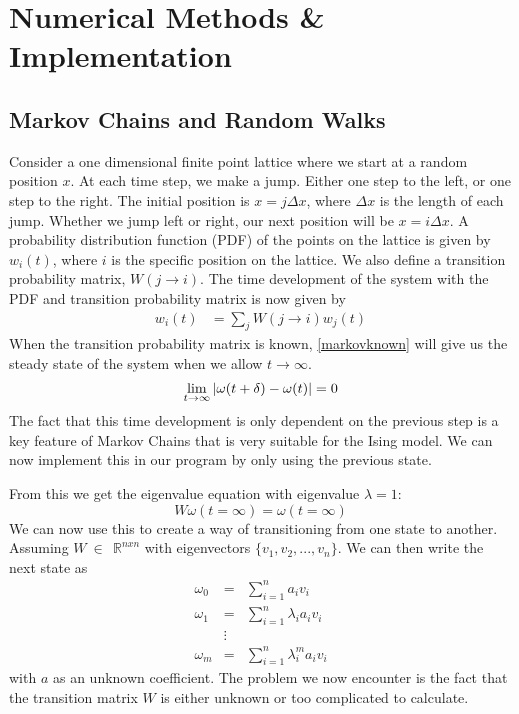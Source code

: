 \section{Numerical Methods \& Implementation}
\subsection{Markov Chains and Random Walks}
Consider a one dimensional finite point lattice where we start at a random position $x$. At each time step, we make a jump. Either one step to the left, or one step to the right.
The initial position is $x = j\Delta x$, where $\Delta x$ is the length of each jump. Whether we jump left or right, our next position will be $x = i\Delta x$. A probability distribution function (PDF) of the points on the lattice is given by $w_i(t)$, where $i$ is the specific position on the lattice. We also define a transition probability matrix, $W(j\rightarrow i)$. The time development of the system with the PDF and transition probability matrix is now given by
\begin{align}
    w_i(t) &= \sum_jW(j\rightarrow i)w_j(t)\label{markovknown}
\end{align}
When the transition probability matrix is known, \eqref{markovknown} will give us the steady state of the system when we allow $t\rightarrow \infty$.
\begin{equation*}
\lim_{t \rightarrow \infty} \abs{\omega(t + \delta) - \omega(t)} = 0
\end{equation*}
The fact that this time development is only dependent on the previous step is a key feature of Markov Chains that is very suitable for the Ising model. We can now implement this in our program by only using the previous state.

From this we get the eigenvalue equation with eigenvalue $\lambda = 1$:
\begin{equation}
    W \omega(t = \infty) = \omega(t = \infty)
\end{equation}
We can now use this to create a way of transitioning from one state to another. Assuming $W \  \in \ \ \mathbb{R}^{n x n}$ with eigenvectors $\{ v_1, v_2, ... , v_n \}$. We can then write the next state as 
\begin{eqnarray*}
\omega_0 &=& \sum^n_{i=1}a_iv_i \\
\omega_1 &=& \sum^n_{i=1} \lambda_i a_iv_i\\
&\vdots& \\
\omega_m &=& \sum^n_{i=1}\lambda_i^m a_i v_i
\end{eqnarray*}
with $a$ as an unknown coefficient. The problem we now encounter is the fact that the transition matrix $W$ is either unknown or too complicated to calculate. 

